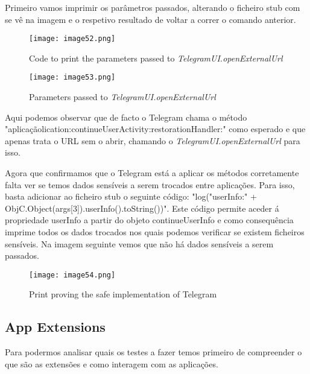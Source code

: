 \begin{enumerate}
	Primeiro vamos imprimir os parâmetros passados, alterando o ficheiro stub com se vê na imagem e o respetivo resultado de voltar a correr o comando anterior.

\begin{figure}[H]
\centering
\texttt{[image: image52.png]}
\caption {Code to print the parameters passed to \textit{TelegramUI.openExternalUrl}}
\label {fig02}
\end{figure}

\begin{figure}[H]
\centering
\texttt{[image: image53.png]}
\caption {Parameters passed to \textit{TelegramUI.openExternalUrl}}
\label {fig02}
\end{figure}

		Aqui podemos observar que de facto o Telegram chama o método "aplicaçãolication:continueUserActivity:restorationHandler:" como esperado e que apenas trata o URL sem o abrir, chamando o \textit{TelegramUI.openExternalUrl} para isso.\par
\hfill\par

	Agora que confirmamos que o Telegram está a aplicar os métodos corretamente falta ver se temos dados sensíveis a serem trocados entre aplicações. Para isso, basta adicionar ao ficheiro stub o seguinte código: "log("userInfo:" + ObjC.Object(args[3]).userInfo().toString())". Este código  permite aceder á propriedade userInfo a partir do objeto continueUserInfo e como consequência imprime todos os dados trocados nos quais podemos verificar se existem ficheiros sensíveis.
	Na imagem seguinte vemos que não há dados sensíveis a serem passados.
	
\begin{figure}[H]
\centering
\texttt{[image: image54.png]}
\caption {Print proving the safe implementation of Telegram}
\label {fig02}
\end{figure}
\end{enumerate}




\subsection{App Extensions}
\hfill\par
Para podermos analisar quais os testes a fazer temos primeiro de compreender o que são as extensões e como interagem com as aplicações.

